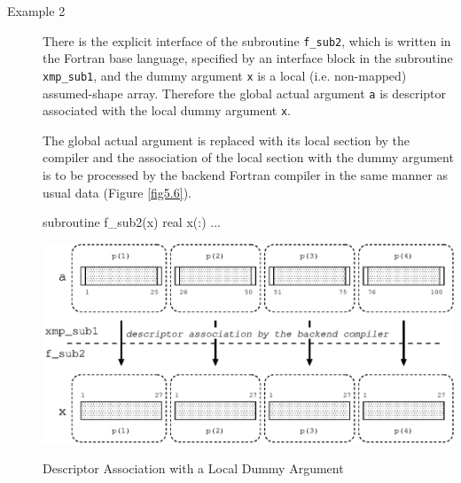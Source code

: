 \begin{description}
\item[Example 2]

	   There is the explicit interface of the subroutine
	   {\tt f\_sub2}, which is written in the Fortran base language,
	   specified by an interface block in the subroutine {\tt
	   xmp\_sub1}, and the dummy argument {\tt x} is a local
	   (i.e. non-mapped) assumed-shape array. Therefore the global
	   actual argument {\tt a} is descriptor associated with the
	   local dummy argument {\tt x}.

	   The global actual argument is replaced with its local section
	   by the {\XMP} compiler and the association of the local
	   section with the dummy argument is to be processed by the
	   backend Fortran compiler in the same manner as usual data 
	   (Figure \ref{fig5.6}).

\begin{Fexample}
      subroutine f_sub2(x)
      real x(:)
      ...
\end{Fexample}

\begin{myfigure}
 \includegraphics[scale=0.7]{figs/fig5.6.eps}
 \caption{Descriptor Association with a Local Dummy Argument}
 \label{fig5.6}
\end{myfigure}

\end{description}


